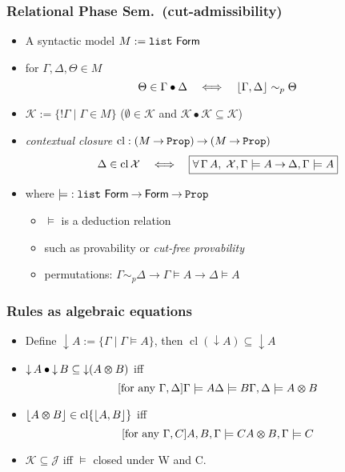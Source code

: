 \documentclass[xcolor=pdftex,graphicx=pdftex,12pt]{beamer}
\renewcommand\frule[1]{\ensuremath{\langle#1\rangle}}
\newcommand{\coq}[1]{\ensuremath{\mathalpha{\mathtt{#1}}}}
\newcommand{\cfun}{\mathbin{\rightarrow}}
\newcommand{\Prop}{\coq{Prop}}
\newcommand{\cdef}{\mathrel{\mathtt{:=}}}
\renewcommand{\iff}{\mathrel\Longleftrightarrow}
\newcommand{\ltime}{\mathbin{\varotimes}}
\newcommand{\lbang}{\mathop{!}}
\newcommand{\cperm}{\mathrel{\sim_p}}
\newcommand{\cl}{\mathop{\mathrm{cl}}}
\newcommand{\mmult}{\mathbin{\bullet}}
\newcommand{\set}[1]{\mathcal{#1}}
\newcommand{\pable}{\mathrel{\models}}
\begin{document}
\begin{frame}

\frametitle{Relational Phase Sem.\ (cut-admissibility)}


\begin{itemize}
\item A syntactic model  $M\cdef \coq{list}~\mathsf{Form}$
\item for $\Gamma,\Delta,\Theta\in M$
$$\Theta\in \Gamma\mmult \Delta \quad\iff\quad\ulist{\Gamma,\Delta}\cperm\Theta$$
\item $\set K\cdef \{\lbang\Gamma\mid\Gamma\in M\}$ ($\emptyset\in\set K$ and $\set K\mmult\set K\subseteq\set K$)
\item \emph{contextual closure}  $\cl: (M\cfun\Prop)\cfun (M\cfun\Prop)$ 
$$\Delta\in\cl\set X\quad\iff\quad \fbox{$\forall\,\Gamma\,A,\;\set X,\Gamma\pable A\cfun \Delta,\Gamma\pable A$}$$ 
\item where ${\pable}:\coq{list}~\mathsf{Form}\cfun\mathsf{Form}\cfun\Prop$
  \begin{itemize}
  \item $\pable$ is a deduction relation
  \item such as provability or \emph{cut-free provability}
  \item permutations: $\Gamma\cperm\Delta\cfun \Gamma\pable A\cfun \Delta\pable A$
  \end{itemize}
\end{itemize}

\end{frame}

\newcommand{\dc}{\mathop{\downarrow}}
\renewcommand\frule[1]{#1}


\begin{frame}

\frametitle{Rules as algebraic equations}

\begin{itemize}

\item Define $\dc A\cdef \{\Gamma\mid \Gamma\pable A\}$, then $\cl(\dc A)\subseteq \dc A$ 
\item $\dc A\mmult\dc B\subseteq \dc(A\ltime B)$ iff 
$$
\infer2[\text{for any $\Gamma,\Delta$}]   {\Gamma \pable A}{\Delta \pable B}
                      {\Gamma, \Delta \pable A \ltime B}$$
\item $\ulist{A\ltime B}\in\cl\{\ulist{A,B}\}$ iff
$$
\infer1[\text{for any $\Gamma,C$}]   {A,B,\Gamma \pable C} 
                      { A \ltime B, \Gamma\pable C}$$
\item $\set K\subseteq\set J$ iff $\pable$ closed under \frule W and \frule C.
\end{itemize}

\end{frame}
\end{document}
